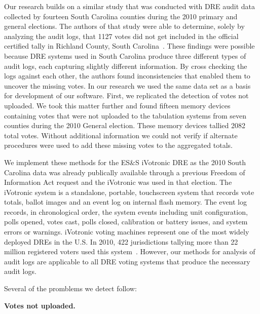 Our research builds on a similar study that was conducted with DRE audit data collected by fourteen South Carolina counties during the 2010 primary and general elections.  The authors of that study were able to determine, solely by analyzing the audit logs, that 1127 votes did not get included in the official certified tally in Richland County, South Carolina~\cite{Buell2011}. These findings were possible because DRE systems used in South Carolina produce three different types of audit logs, each capturing slightly different information. By cross checking the logs against each other, the authors found inconsistencies that enabled them to uncover the missing votes. In our research we used the same data set as a basis for development of our software. First, we replicated the detection of votes not uploaded. We took this matter further and found fifteen memory devices containing votes that were not uploaded to the tabulation systems from seven counties during the 2010 General election. These memory devices tallied 2082 total votes. Without additional information we could not verify if alternate procedures were used to add these missing votes to the aggregated totals. 

We implement these methods for the ES\&S iVotronic DRE as the 2010 South
Carolina data was already publically available through a previous
Freedom of Information Act request and the iVotronic was used in that election.  The iVotronic system is a
standalone, portable, touchscreen system that records vote totals,
ballot images and an event log on internal flash 
memory. The event log records, in chronological order, the system
events including unit configuration, polls opened, votes cast, polls
closed, calibration or battery issues, and system errors or warnings. 
iVotronic voting machines represent one of the most widely deployed
DREs in the U.S. In 2010, 422 jurisdictions tallying more than 22
million registered voters used this system~\cite{VerVot2010}. However, our methods for analysis of audit logs
are applicable to all DRE voting systems  that produce the necessary
audit logs.  


Several of the promblems we detect follow:

\textbf{Votes not uploaded.} %

